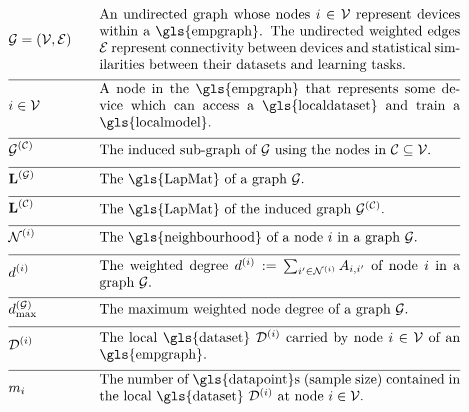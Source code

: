 \begin{align}
 	&\graph = \pair{\nodes}{\edges} & \quad & \parbox{.75\textwidth}{An undirected graph whose nodes $\nodeidx \in \nodes$ represent 
	devices within a \gls{empgraph}. The undirected weighted edges $\edges$ represent connectivity between 
	devices and statistical similarities between their datasets and learning tasks.}\nonumber \\[2mm] \hline \nonumber\\[-5mm]
&\nodeidx \in \nodes& \quad & \parbox{.75\textwidth}{A node in the \gls{empgraph} that represents some 
	device which can access a \gls{localdataset} and train a \gls{localmodel}.}\nonumber \\[2mm] \hline \nonumber\\[-5mm]
	&\indsubgraph{\graph}{\cluster}& \quad & \parbox{.75\textwidth}{The induced sub-graph of $\graph$ using the nodes in $\cluster \subseteq \nodes$.} \nonumber \\[2mm] \hline \nonumber\\[-5mm]
	&\LapMat{\graph}   & \quad & \parbox{.75\textwidth}{The \gls{LapMat} of a graph $\graph$.}\nonumber \\[2mm] \hline \nonumber\\[-5mm]
		&\LapMat{\cluster}   & \quad & \parbox{.75\textwidth}{The \gls{LapMat} of the induced graph $\indsubgraph{\graph}{\cluster}$.} \nonumber \\[2mm] \hline \nonumber\\[-5mm]
	 &		\neighbourhood{\nodeidx}  & \quad & \parbox{.75\textwidth}{The \gls{neighbourhood} of a node $\nodeidx$ in a graph $\graph$.}   \nonumber \\[2mm] \hline \nonumber\\[-5mm]
	&\nodedegree{\nodeidx} & \quad & \parbox{.75\textwidth}{The weighted degree $\nodedegree{\nodeidx}\defeq \sum_{\nodeidx' \in \neighbourhood{\nodeidx}} \edgeweight_{\nodeidx,\nodeidx'}$ of node $\nodeidx$ in a graph $\graph$.}  \nonumber \\[2mm] \hline \nonumber\\[-5mm]
	&\maxnodedegree^{(\graph)} & \quad & \parbox{.75\textwidth}{The maximum weighted node degree of a graph $\graph$.} \nonumber \\[2mm] \hline \nonumber\\[-5mm] 
&\localdataset{\nodeidx} & \quad & \parbox{.75\textwidth}{The local \gls{dataset} $\localdataset{\nodeidx}$ carried by 
			node $\nodeidx\in \nodes$ of an \gls{empgraph}.} \nonumber \\[2mm] \hline \nonumber\\[-5mm]
&\localsamplesize{\nodeidx} & \quad & \parbox{.75\textwidth}{The number of \gls{datapoint}s (sample size) contained in the 
			local \gls{dataset} $\localdataset{\nodeidx}$ at node $\nodeidx\in \nodes$.} \nonumber 
\end{align} 
